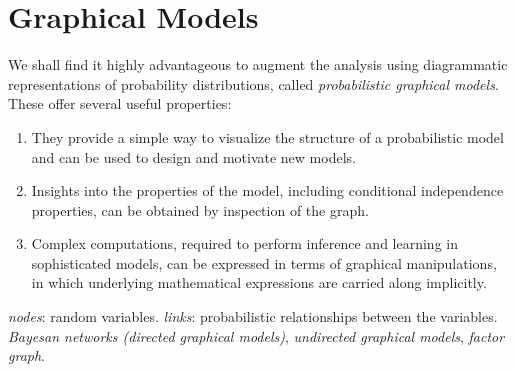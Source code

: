 \documentclass[a4paper]{book}
\begin{document}
\section{Graphical Models}
We shall find it highly advantageous to augment the analysis using diagrammatic representations of probability distributions, called \textit{probabilistic graphical models}. These offer several useful properties:
\begin{enumerate}
    \item They provide a simple way to visualize the structure of a probabilistic model and can be used to design and motivate new models.
    \item Insights into the properties of the model, including conditional independence properties, can be obtained by inspection of the graph.
    \item Complex computations, required to perform inference and learning in sophisticated models, can be expressed in terms of graphical manipulations, in which underlying mathematical expressions are carried along implicitly.
\end{enumerate}
\textit{nodes}: random variables. \textit{links}: probabilistic relationships between the variables.
\newline
\textit{Bayesan networks (directed graphical models)}, \textit{undirected graphical models}, \textit{factor graph}.
\end{document}
